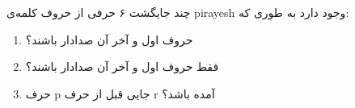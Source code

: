 چند جایگشت ۶ حرفی از حروف کلمه‌ی pirayesh
وجود دارد به طوری که:
\begin{enumerate}
  \item 
    حروف اول و آخر آن صدادار باشند؟

  \item 
    فقط حروف اول و آخر آن صدادار باشند؟

  \item 
    حرف p 
    جایی قبل از حرف r 
    آمده باشد؟
\end{enumerate}